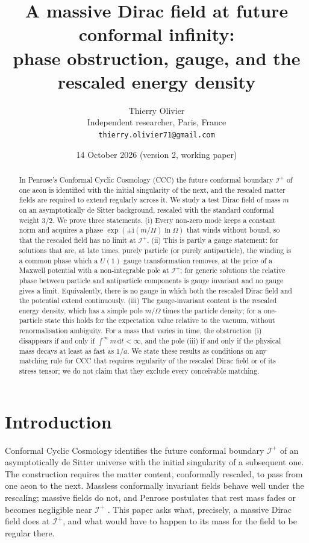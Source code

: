 \documentclass[11pt,a4paper]{article}
\title{\textbf{A massive Dirac field at future conformal infinity:\\ phase obstruction, gauge, and the rescaled energy density}}
\author{Thierry Olivier\\ \small Independent researcher, Paris, France\\ \small \texttt{thierry.olivier71@gmail.com}}
\date{14 October 2026 \quad (version 2, working paper)}
\theoremstyle{definition}
\newcommand{\scri}{\mathscr{I}^{+}}
\newcommand{\dd}{\mathrm{d}}
\newcommand{\ii}{\mathrm{i}}
\begin{document}
\maketitle

\begin{abstract}
In Penrose's Conformal Cyclic Cosmology (CCC) the future conformal boundary $\scri$ of one aeon is identified with the initial singularity of the next, and the rescaled matter fields are required to extend regularly across it. We study a test Dirac field of mass $m$ on an asymptotically de Sitter background, rescaled with the standard conformal weight $3/2$. We prove three statements. (i) Every non-zero mode keeps a constant norm and acquires a phase $\exp(\pm\ii(m/H)\ln\Omega)$ that winds without bound, so that the rescaled field has no limit at $\scri$. (ii) This is partly a gauge statement: for solutions that are, at late times, purely particle (or purely antiparticle), the winding is a common phase which a $U(1)$ gauge transformation removes, at the price of a Maxwell potential with a non-integrable pole at $\scri$; for generic solutions the relative phase between particle and antiparticle components is gauge invariant and no gauge gives a limit. Equivalently, there is no gauge in which both the rescaled Dirac field and the potential extend continuously. (iii) The gauge-invariant content is the rescaled energy density, which has a simple pole $m/\Omega$ times the particle density; for a one-particle state this holds for the expectation value relative to the vacuum, without renormalisation ambiguity. For a mass that varies in time, the obstruction (i) disappears if and only if $\int^\infty m\,\dd t<\infty$, and the pole (iii) if and only if the physical mass decays at least as fast as $1/a$. We state these results as conditions on any matching rule for CCC that requires regularity of the rescaled Dirac field or of its stress tensor; we do not claim that they exclude every conceivable matching.
\end{abstract}

\section{Introduction}

Conformal Cyclic Cosmology \cite{Penrose2010,Tod2013,MeissnerPenrose2025} identifies the future conformal boundary $\scri$ of an asymptotically de Sitter universe with the initial singularity of a subsequent one. The construction requires the matter content, conformally rescaled, to pass from one aeon to the next. Massless conformally invariant fields behave well under the rescaling; massive fields do not, and Penrose postulates that rest mass fades or becomes negligible near $\scri$ \cite{Penrose2010}. This paper asks what, precisely, a massive Dirac field does at $\scri$, and what would have to happen to its mass for the field to be regular there.
\end{document}
